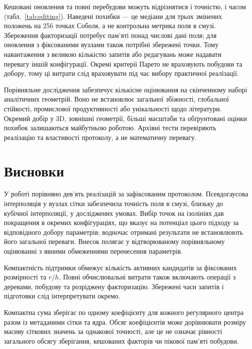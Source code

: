 \documentclass[12pt]{article}
\begin{document}
Кешовані оновлення та повні перебудови можуть відрізнятися і точністю, і часом (табл.~\ref{tab:editing}). Наведені похибки — це медіани для трьох змінених положень на 256 точках Соболя, а не контрольна метрика поля в смузі. Збереження факторизації потребує пам'яті понад числові дані поля; для оновлення з фіксованими вузлами також потрібні збережені точки. Тому навантаження з великою кількістю запитів або редагувань може надавати перевагу іншій конфігурації. Окремі критерії Парето не враховують побудови та добору, тому ці витрати слід враховувати під час вибору практичної реалізації.
\begin{table}[htbp]\centering\resizebox{\linewidth}{!}{}\caption{Редагування для ресурсних випадків тора з табл.~\ref{tab:resources}. RMSE — медіана збережених похибок для трьох редагувань.}\label{tab:editing}\end{table}

Порівняльне дослідження забезпечує кількісне оцінювання на скінченному наборі аналітичних геометрій. Воно не встановлює загальної збіжності, глобальної стійкості, промислової продуктивності або унікальності щодо літератури. Окремий добір у 3D, зовнішні геометрії, більші масштаби та обґрунтовані оцінки похибок залишаються майбутньою роботою. Архівні тести перевіряють реалізацію та властивості протоколу, а не математичну перевагу.

\section{Висновки}
У роботі порівняно дев'ять реалізацій за зафіксованим протоколом. Псевдогаусова інтерполяція у вузлах сітки забезпечила точність поля в смузі, близьку до кубічної інтерполяції, у досліджених умовах. Вибір точок на ізолініях дав покращення в окремих конфігураціях, що вказує на потенціал цього підходу за відповідного добору параметрів; водночас отримані результати не встановлюють його загальної переваги. Внесок полягає у відтворюваному порівняльному оцінюванні з явними обмеженнями перенесення параметрів.

Компактність підтримки обмежує кількість активних кандидатів за фіксованих розмірності та $r/h$. Повні обчислювальні витрати також включають операції з деревами, побудову та розріджену факторизацію. Збережені часи запитів і підготовки слід інтерпретувати окремо.

Компактна сума зберігає по одному коефіцієнту для кожного регулярного центра разом із метаданими сітки та ядра. Обсяг коефіцієнтів може дорівнювати розміру масиву сіткових значень за однакової точності, але це не означає рівності загального обсягу зберігання, кешованих факторів чи пікової пам'яті побудови.
\end{document}
